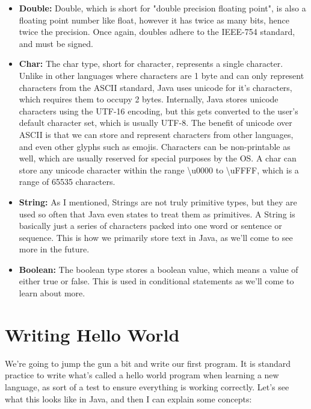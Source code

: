 \documentclass{article}
\begin{document}
\begin{itemize}
\item{%
    \textbf{Double:} Double, which is short for "double precision floating point", is also a floating point
    number like float, however it has twice as many bits, hence twice the precision. Once again, doubles
    adhere to the IEEE-754 standard, and must be signed.
}

\item{%
    \textbf{Char:} The char type, short for character, represents a single character. Unlike in other languages
    where characters are 1 byte and can only represent characters from the ASCII standard, Java uses unicode
    for it’s characters, which requires them to occupy 2 bytes. Internally, Java stores unicode characters
    using the UTF-16 encoding, but this gets converted to the user’s default character set, which is usually
    UTF-8. The benefit of unicode over ASCII is that we can store and represent characters from other
    languages, and even other glyphs such as emojis. Characters can be non-printable as well, which are
    usually reserved for special purposes by the OS. A char can store any unicode character within the range
    \textbackslash{}u0000 to \textbackslash{}uFFFF, which is a range of 65535 characters.
}

\item{%
    \textbf{String:} As I mentioned, Strings are not truly primitive types, but they are used so often that
    Java even states to treat them as primitives. A String is basically just a series of characters packed
    into one word or sentence or sequence. This is how we primarily store text in Java, as we’ll come to see
    more in the future.
}

\item{%
    \textbf{Boolean:} The boolean type stores a boolean value, which means a value of either true or false.
    This is used in conditional statements as we’ll come to learn about more.
}

\end{itemize}

\section{Writing Hello World}

We’re going to jump the gun a bit and write our first program. It is standard practice to write what’s called
a hello world program when learning a new language, as sort of a test to ensure everything is working
correctly. Let’s see what this looks like in Java, and then I can explain some concepts:
\end{document}
